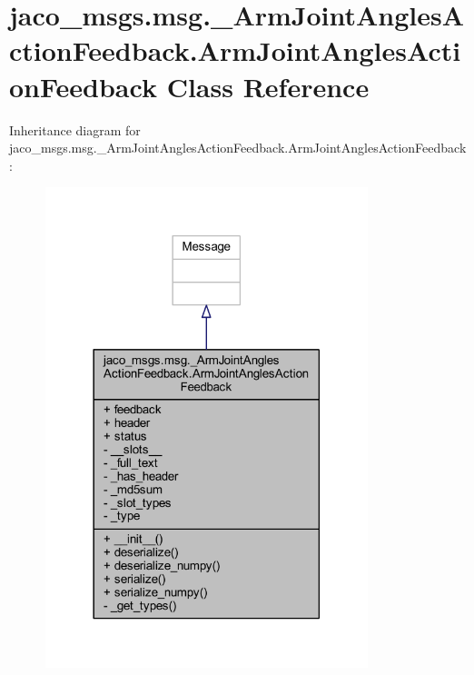 \hypertarget{classjaco__msgs_1_1msg_1_1__ArmJointAnglesActionFeedback_1_1ArmJointAnglesActionFeedback}{}\section{jaco\+\_\+msgs.\+msg.\+\_\+\+Arm\+Joint\+Angles\+Action\+Feedback.\+Arm\+Joint\+Angles\+Action\+Feedback Class Reference}
\label{classjaco__msgs_1_1msg_1_1__ArmJointAnglesActionFeedback_1_1ArmJointAnglesActionFeedback}


Inheritance diagram for jaco\+\_\+msgs.\+msg.\+\_\+\+Arm\+Joint\+Angles\+Action\+Feedback.\+Arm\+Joint\+Angles\+Action\+Feedback\+:
\nopagebreak
\begin{figure}[H]
\begin{center}
\leavevmode
\includegraphics[width=266pt]{d3/d84/classjaco__msgs_1_1msg_1_1__ArmJointAnglesActionFeedback_1_1ArmJointAnglesActionFeedback__inherit__graph}
\end{center}
\end{figure}


